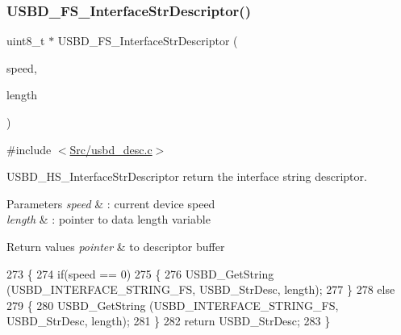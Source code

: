 \subsubsection{\texorpdfstring{U\+S\+B\+D\+\_\+\+F\+S\+\_\+\+Interface\+Str\+Descriptor()}{USBD\_FS\_InterfaceStrDescriptor()}}
{\footnotesize\ttfamily uint8\+\_\+t $\ast$ U\+S\+B\+D\+\_\+\+F\+S\+\_\+\+Interface\+Str\+Descriptor (\begin{DoxyParamCaption}\item[{U\+S\+B\+D\+\_\+\+Speed\+Type\+Def}]{speed,  }\item[{uint16\+\_\+t $\ast$}]{length }\end{DoxyParamCaption})}



{\ttfamily \#include $<$\mbox{\hyperlink{usbd__desc_8c}{Src/usbd\+\_\+desc.\+c}}$>$}



U\+S\+B\+D\+\_\+\+H\+S\+\_\+\+Interface\+Str\+Descriptor return the interface string descriptor. 


\begin{DoxyParams}{Parameters}
{\em speed} & \+: current device speed \\
\hline
{\em length} & \+: pointer to data length variable \\
\hline
\end{DoxyParams}

\begin{DoxyRetVals}{Return values}
{\em pointer} & to descriptor buffer \\
\hline
\end{DoxyRetVals}

\begin{DoxyCode}
273 \{
274   \textcolor{keywordflow}{if}(speed == 0)
275   \{
276     USBD\_GetString (USBD\_INTERFACE\_STRING\_FS, USBD\_StrDesc, length);
277   \}
278   \textcolor{keywordflow}{else}
279   \{
280     USBD\_GetString (USBD\_INTERFACE\_STRING\_FS, USBD\_StrDesc, length);
281   \}
282   \textcolor{keywordflow}{return} USBD\_StrDesc;  
283 \}
\end{DoxyCode}
\mbox{\label{group___u_s_b_d___d_e_s_c___private___functions_gac02628ceb6a6a071e192dcb85063c0cc}} 
